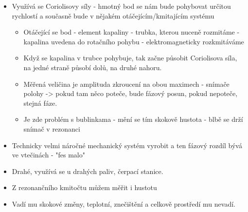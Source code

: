 \begin{itemize}
    \item Využívá se Coriolisovy síly - hmotný bod se nám bude pohybovat určitou rychlostí a současně bude v nějakém otáčejícím/kmitajícím systému \begin{itemize}
        \item Otáčející se bod - element kapaliny - trubka, kterou nuceně rozmitáme - kapalina uvedena do rotačního pohybu - elektromagneticky rozkmitáváme
        \item Když se kapalina v trubce pohybuje, tak začne působit Coriolisova síla, na jedné straně působí dolů, na druhé nahoru.
        \item Měřená veličina je amplituda zkroucení na obou maximech - snímače polohy -> pokud tam něco poteče, bude fázový posun, pokud nepoteče, stejná fáze.
        \item Je zde problém s bublinkama - mění se tím skokově hustota - blbě se drží snímač v rezonanci
    \end{itemize}
    \item Technicky velmi náročné mechanický systém vyrobit a ten fázový rozdíl bývá ve vtečinách - "fes malo"
    \item Drahé, využívá se u drahých paliv, čerpací stanice.
    \item Z rezonančního kmitočtu můžem měřit i hustotu
    \item Vadí mu skokové změny, teplotní, znečištění a celkově prostředí mu nevadí.
\end{itemize}

